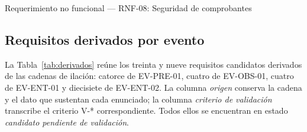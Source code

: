 \begin{ficha}{Requerimiento no funcional — RNF-08: Seguridad de comprobantes}
\end{ficha}

\subsection{Requisitos derivados por evento}
\label{subsec:derivados}

La Tabla~\ref{tab:derivados} reúne los treinta y nueve requisitos
candidatos derivados de las cadenas de ilación: catorce de EV-PRE-01,
cuatro de EV-OBS-01, cuatro de EV-ENT-01 y diecisiete de EV-ENT-02. La
columna \emph{origen} conserva la cadena y el dato que sustentan cada
enunciado; la columna \emph{criterio de validación} transcribe el criterio
V-* correspondiente. Todos ellos se encuentran en estado \emph{candidato
pendiente de validación}.


